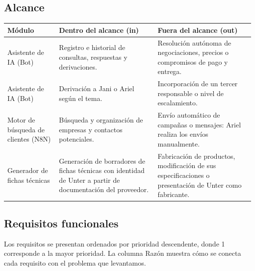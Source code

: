\documentclass{article}
\begin{document}
\subsection{Alcance}

\begin{table}[H]
\centering
\small
\begin{tabularx}{\textwidth}{lLL}
\toprule
\textbf{Módulo} & \textbf{Dentro del alcance (in)} & \textbf{Fuera del alcance (out)} \\
\midrule
Asistente de IA (Bot) & Registro e historial de consultas, respuestas y derivaciones. & Resolución autónoma de negociaciones, precios o compromisos de pago y entrega. \\
\addlinespace
Asistente de IA (Bot) & Derivación a Jani o Ariel según el tema. & Incorporación de un tercer responsable o nivel de escalamiento. \\
\addlinespace
Motor de búsqueda de clientes (N8N) & Búsqueda y organización de empresas y contactos potenciales. & Envío automático de campañas o mensajes: Ariel realiza los envíos manualmente. \\
\addlinespace
Generador de fichas técnicas & Generación de borradores de fichas técnicas con identidad de Unter a partir de documentación del proveedor. & Fabricación de productos, modificación de sus especificaciones o presentación de Unter como fabricante. \\
\bottomrule
\end{tabularx}
\end{table}

\subsection{Requisitos funcionales}

Los requisitos se presentan ordenados por prioridad descendente, donde 1 corresponde a la mayor prioridad. La columna Razón muestra cómo se conecta cada requisito con el problema que levantamos.
\end{document}
